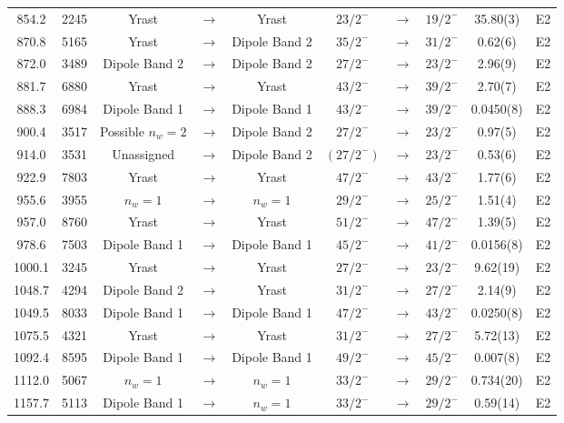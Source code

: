 \begin{landscape}
\begin{center}
\begin{longtable}{|c|c|ccc|ccc|c|c|}
 854.2&2245&Yrast&$ \rightarrow $&Yrast&$ 23/2^{-} $&$ \rightarrow $&$ 19/2^{-} $& 35.80(3)& E2 \\
 870.8&5165&Yrast&$ \rightarrow $&Dipole Band 2&$ 35/2^{-} $&$ \rightarrow $&$ 31/2^{-} $& 0.62(6)& E2 \\
 872.0&3489&Dipole Band 2&$ \rightarrow $&Dipole Band 2&$ 27/2^{-} $&$ \rightarrow $&$ 23/2^{-} $& 2.96(9)& E2 \\
 881.7&6880&Yrast&$ \rightarrow $&Yrast&$ 43/2^{-} $&$ \rightarrow $&$ 39/2^{-} $& 2.70(7)& E2 \\
 888.3&6984&Dipole Band 1&$ \rightarrow $&Dipole Band 1&$ 43/2^{-} $&$ \rightarrow $&$ 39/2^{-} $& 0.0450(8)& E2 \\
 900.4&3517&Possible $n_w=2$&$ \rightarrow $&Dipole Band 2&$ 27/2^{-} $&$ \rightarrow $&$ 23/2^{-} $& 0.97(5)& E2 \\
 914.0&3531&Unassigned&$ \rightarrow $&Dipole Band 2&$ (27/2^{-}) $&$ \rightarrow $&$ 23/2^{-} $& 0.53(6)& E2 \\
 922.9&7803&Yrast&$ \rightarrow $&Yrast&$ 47/2^{-} $&$ \rightarrow $&$ 43/2^{-} $& 1.77(6)& E2 \\
 955.6&3955&$n_w=1$&$ \rightarrow $&$n_w=1$&$ 29/2^{-} $&$ \rightarrow $&$ 25/2^{-} $& 1.51(4)& E2 \\
 957.0&8760&Yrast&$ \rightarrow $&Yrast&$ 51/2^{-} $&$ \rightarrow $&$ 47/2^{-} $& 1.39(5)& E2 \\
 978.6&7503&Dipole Band 1&$ \rightarrow $&Dipole Band 1&$ 45/2^{-} $&$ \rightarrow $&$ 41/2^{-} $& 0.0156(8)& E2 \\
 1000.1&3245&Yrast&$ \rightarrow $&Yrast&$ 27/2^{-} $&$ \rightarrow $&$ 23/2^{-} $& 9.62(19)& E2 \\
 1048.7&4294&Dipole Band 2&$ \rightarrow $&Yrast&$ 31/2^{-} $&$ \rightarrow $&$ 27/2^{-} $& 2.14(9)& E2 \\
 1049.5&8033&Dipole Band 1&$ \rightarrow $&Dipole Band 1&$ 47/2^{-} $&$ \rightarrow $&$ 43/2^{-} $& 0.0250(8)& E2 \\
 1075.5&4321&Yrast&$ \rightarrow $&Yrast&$ 31/2^{-} $&$ \rightarrow $&$ 27/2^{-} $& 5.72(13)& E2 \\
 1092.4&8595&Dipole Band 1&$ \rightarrow $&Dipole Band 1&$ 49/2^{-} $&$ \rightarrow $&$ 45/2^{-} $& 0.007(8)& E2 \\
 1112.0&5067&$n_w=1$&$ \rightarrow $&$n_w=1$&$ 33/2^{-} $&$ \rightarrow $&$ 29/2^{-} $& 0.734(20)& E2 \\
 1157.7&5113&Dipole Band 1&$ \rightarrow $&$n_w=1$&$ 33/2^{-} $&$ \rightarrow $&$ 29/2^{-} $& 0.59(14)& E2 \\

\end{longtable}
\end{center}
\end{landscape}
